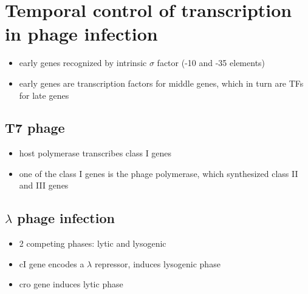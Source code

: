\documentclass[10pt]{article}
\newenvironment{mitemize}
{
  \begin{itemize}
  \setlength{\itemsep}{1pt}
  \setlength{\parskip}{0pt}
  \setlength{\parsep}{0pt}}{\end{itemize}
}
\begin{document}
\section*{Temporal control of transcription in phage infection}
\begin{mitemize}
  \item early genes recognized by intrinsic $\sigma$ factor (-10 and -35 elements)
  \item early genes are transcription factors for middle genes, which in turn are TFs for late genes
\end{mitemize}

\subsection*{T7 phage}
\begin{itemize}
  \item host polymerase transcribes class I genes
  \item one of the class I genes is the phage polymerase, which synthesized class II and III genes
\end{itemize}

\subsection*{$\lambda$ phage infection}
\begin{itemize}
  \item 2 competing phases: lytic and lysogenic
  \item cI gene encodes a $\lambda$ repressor, induces lysogenic phase
  \item cro gene induces lytic phase
\end{itemize}
\end{document}
